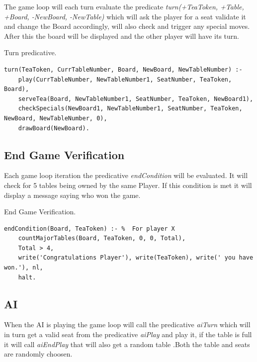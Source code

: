 \documentclass[a4paper]{article}
\begin{document}
The game loop will each turn evaluate the predicate \textit{turn(+TeaToken, +Table, +Board, -NewBoard, -NewTable)}
 which will ask the player for a seat validate it and change the Board accordingly, will also check and trigger any special moves.
  After this the board will be displayed
  and the other player will have its turn.

    \begin{listing}[H]
            \caption{Turn predicative.}
            \label{Codigo:cod_turn}
            \begin{verbatim}
turn(TeaToken, CurrTableNumber, Board, NewBoard, NewTableNumber) :-
    play(CurrTableNumber, NewTableNumber1, SeatNumber, TeaToken, Board),
    serveTea(Board, NewTableNumber1, SeatNumber, TeaToken, NewBoard1),
    checkSpecials(NewBoard1, NewTableNumber1, SeatNumber, TeaToken, NewBoard, NewTableNumber, 0),
    drawBoard(NewBoard).

    \end{verbatim}

    \end{listing}


\subsection{End Game Verification}
 Each game loop iteration the predicative \textit{endCondition} will be evaluated. It will check for 5 tables being owned by the same Player. If this condition is met it will
  display a message saying who won the game.

\renewcommand\listingscaption{Code}

\begin{listing}[H]
    \caption{End Game Verification.}
    \label{Codigo:cod_end}
    \begin{verbatim}
endCondition(Board, TeaToken) :- %  For player X
    countMajorTables(Board, TeaToken, 0, 0, Total),
    Total > 4,
    write('Congratulations Player'), write(TeaToken), write(' you have won.'), nl,
    halt.

\end{verbatim}

\end{listing}

\subsection{AI}
    When the AI is playing the game loop will call the predicative \textit{aiTurn} which will in turn get a valid seat
    from the predicative \textit{aiPlay} and play it, if the table is full it will call \textit{aiEndPlay} that will also get a random table
    .Both the table and seats are randomly choosen.
\end{document}

